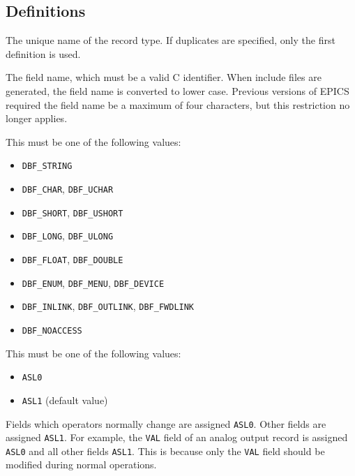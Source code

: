 \subsection{Definitions}

\begin{description}
\item [record\_type] The unique name of the record type.
If duplicates are specified, only the first definition is used.

\item [field\_name] The field name, which must be a valid C identifier.
When include files are generated, the field name is converted to lower case.
Previous versions of EPICS required the field name be a maximum of four characters, but this restriction no longer applies.

\item [field\_type] This must be one of the following values:

\begin{itemize}
\item \verb|DBF_STRING|
\item \verb|DBF_CHAR|, \verb|DBF_UCHAR|
\item \verb|DBF_SHORT|, \verb|DBF_USHORT|
\item \verb|DBF_LONG|, \verb|DBF_ULONG|
\item \verb|DBF_FLOAT|, \verb|DBF_DOUBLE|
\item \verb|DBF_ENUM|, \verb|DBF_MENU|, \verb|DBF_DEVICE|
\item \verb|DBF_INLINK|, \verb|DBF_OUTLINK|, \verb|DBF_FWDLINK|
\item \verb|DBF_NOACCESS|
\end{itemize}

\item [as\_level] This must be one of the following values:

\begin{itemize}
\item \verb|ASL0|
\item \verb|ASL1|  (default value)
\end{itemize}

Fields which operators normally change are assigned \verb|ASL0|.
Other fields are assigned \verb|ASL1|.
For example, the \verb|VAL| field of an analog output record is assigned \verb|ASL0| and all other fields \verb|ASL1|.
This is because only the \verb|VAL| field should be modified during normal operations.


\end{description}
